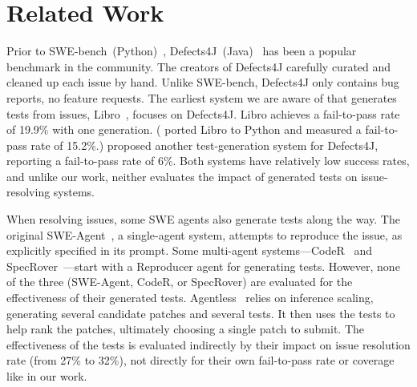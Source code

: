 \section{Related Work}\label{sec:related}


Prior to SWE-bench~(Python)~\cite{jimenezswe},
Defects4J~(Java)~\cite{just2014defects4j} has been a popular benchmark
in the community.
The creators of Defects4J carefully curated and cleaned up each issue
by hand.
Unlike SWE-bench, Defects4J only contains bug reports, no feature
requests.
The earliest system we are aware of that generates tests from issues,
Libro~\cite{kang2023large}, focuses on Defects4J.
Libro achieves a fail-to-pass rate of 19.9\% with one generation.
(\citet{mundler2024swtbench} ported Libro to Python and measured a
fail-to-pass rate of 15.2\%.)
\citet{plein_et_al_2024} proposed another test-generation system for
Defects4J, reporting a fail-to-pass rate of 6\%.
Both systems have relatively low success rates, and
unlike our work, neither evaluates the impact of generated tests on
issue-resolving systems.

When resolving issues, some SWE agents also generate tests along the
way.
The original
SWE-Agent~\cite{sweagent2}, a single-agent system, attempts to reproduce the issue,
as explicitly specified in its prompt.
Some multi-agent systems---CodeR~\cite{sweagent3coder} and SpecRover~\cite{autocoderover2}---start with a Reproducer agent for generating tests.
However, none of the three (SWE-Agent, CodeR, or SpecRover)
are evaluated for the effectiveness of their generated tests.
Agentless~\cite{sweagent5agentless} relies on inference
scaling, generating several candidate patches and several
tests.
It then uses the tests to help rank the patches, ultimately choosing a
single patch to submit.
The effectiveness of the tests is evaluated indirectly by their impact
on issue resolution rate (from 27\% to 32\%), not directly for their
own fail-to-pass rate or coverage like in our work.

